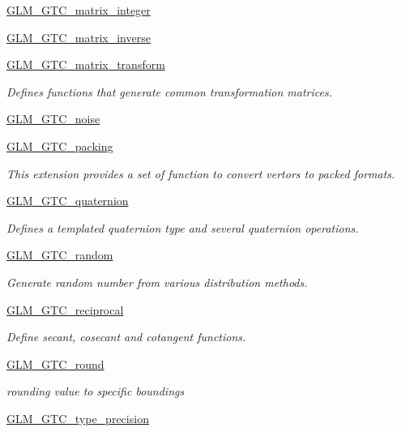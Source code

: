 \begin{DoxyCompactItemize}
\item 
\hyperlink{group__gtc__matrix__integer}{G\-L\-M\-\_\-\-G\-T\-C\-\_\-matrix\-\_\-integer}
\item 
\hyperlink{group__gtc__matrix__inverse}{G\-L\-M\-\_\-\-G\-T\-C\-\_\-matrix\-\_\-inverse}
\item 
\hyperlink{group__gtc__matrix__transform}{G\-L\-M\-\_\-\-G\-T\-C\-\_\-matrix\-\_\-transform}
\begin{DoxyCompactList}\small\item\em Defines functions that generate common transformation matrices. \end{DoxyCompactList}\item 
\hyperlink{group__gtc__noise}{G\-L\-M\-\_\-\-G\-T\-C\-\_\-noise}
\item 
\hyperlink{group__gtc__packing}{G\-L\-M\-\_\-\-G\-T\-C\-\_\-packing}
\begin{DoxyCompactList}\small\item\em This extension provides a set of function to convert vertors to packed formats. \end{DoxyCompactList}\item 
\hyperlink{group__gtc__quaternion}{G\-L\-M\-\_\-\-G\-T\-C\-\_\-quaternion}
\begin{DoxyCompactList}\small\item\em Defines a templated quaternion type and several quaternion operations. \end{DoxyCompactList}\item 
\hyperlink{group__gtc__random}{G\-L\-M\-\_\-\-G\-T\-C\-\_\-random}
\begin{DoxyCompactList}\small\item\em Generate random number from various distribution methods. \end{DoxyCompactList}\item 
\hyperlink{group__gtc__reciprocal}{G\-L\-M\-\_\-\-G\-T\-C\-\_\-reciprocal}
\begin{DoxyCompactList}\small\item\em Define secant, cosecant and cotangent functions. \end{DoxyCompactList}\item 
\hyperlink{group__gtc__round}{G\-L\-M\-\_\-\-G\-T\-C\-\_\-round}
\begin{DoxyCompactList}\small\item\em rounding value to specific boundings \end{DoxyCompactList}\item 
\hyperlink{group__gtc__type__precision}{G\-L\-M\-\_\-\-G\-T\-C\-\_\-type\-\_\-precision}

\end{DoxyCompactItemize}
